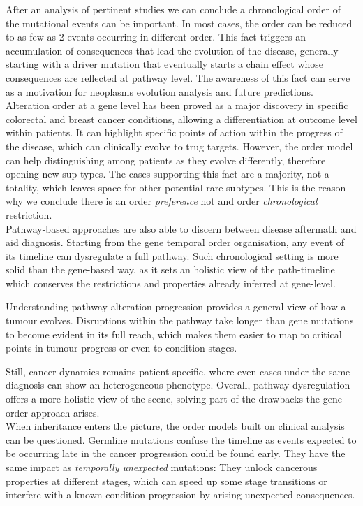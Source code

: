 After an analysis of pertinent studies we can conclude a chronological order of the mutational events can be important. In most cases, the order can be reduced to as few as 2 events occurring in different order. This fact triggers an accumulation of consequences that lead the evolution of the disease, generally starting with a driver mutation that eventually starts a chain effect whose consequences are reflected at pathway level. The awareness of this fact can serve as a motivation for neoplasms evolution analysis and future predictions.
\\

Alteration order at a gene level has been proved as a major discovery in specific colorectal and breast cancer conditions, allowing a differentiation at outcome level within patients. It can highlight specific points of action within the progress of the disease, which can clinically evolve to trug targets. However, the order model can help distinguishing among patients as they evolve differently, therefore opening new sup-types. The cases supporting this fact are a majority, not a totality, which leaves space for other potential rare subtypes. This is the reason why we conclude there is an order \emph{preference} not and order \emph{chronological} restriction.
\\

Pathway-based approaches are also able to discern between disease aftermath and aid diagnosis. Starting from the gene temporal order organisation, any event of its timeline can dysregulate a full pathway. Such chronological setting is more solid than the gene-based way, as it sets an holistic view of the path-timeline which conserves the restrictions and properties already inferred at gene-level.

Understanding pathway alteration progression provides a general view of how a tumour evolves. Disruptions within the pathway take longer than gene mutations to become evident in its full reach, which makes them easier to map to critical points in tumour progress or even to condition stages.

Still, cancer dynamics remains patient-specific, where even cases under the same diagnosis can show an heterogeneous phenotype. Overall, pathway dysregulation offers a more holistic view of the scene, solving part of the drawbacks the gene order approach arises.
\\

When inheritance enters the picture, the order models built on clinical analysis can be questioned. Germline mutations confuse the timeline as events expected to be occurring late in the cancer progression could be found early.
They have the same impact as \emph{temporally unexpected} mutations: They unlock cancerous properties at different stages, which can speed up some stage transitions or interfere with a known condition progression by arising unexpected consequences.
